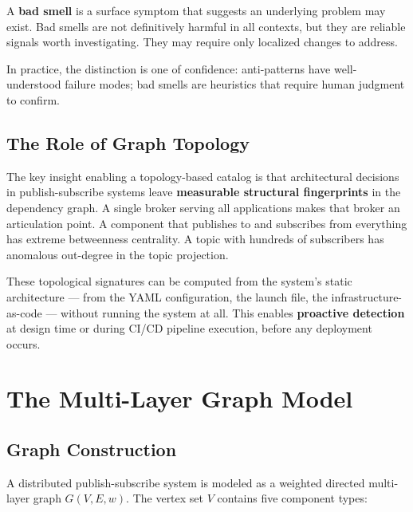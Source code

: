 \documentclass[11pt]{article}
\begin{document}
A \textbf{bad smell} is a surface symptom that suggests an underlying problem may exist. Bad smells are not definitively harmful in all contexts, but they are reliable signals worth investigating. They may require only localized changes to address.

In practice, the distinction is one of confidence: anti-patterns have well-understood failure modes; bad smells are heuristics that require human judgment to confirm.

\subsection{The Role of Graph Topology}

The key insight enabling a topology-based catalog is that architectural decisions in publish-subscribe systems leave \textbf{measurable structural fingerprints} in the dependency graph. A single broker serving all applications makes that broker an articulation point. A component that publishes to and subscribes from everything has extreme betweenness centrality. A topic with hundreds of subscribers has anomalous out-degree in the topic projection.

These topological signatures can be computed from the system's static architecture --- from the YAML configuration, the launch file, the infrastructure-as-code --- without running the system at all. This enables \textbf{proactive detection} at design time or during CI/CD pipeline execution, before any deployment occurs.

\section{The Multi-Layer Graph Model}

\subsection{Graph Construction}

A distributed publish-subscribe system is modeled as a weighted directed multi-layer graph $G(V, E, w)$. The vertex set $V$ contains five component types:
\end{document}
